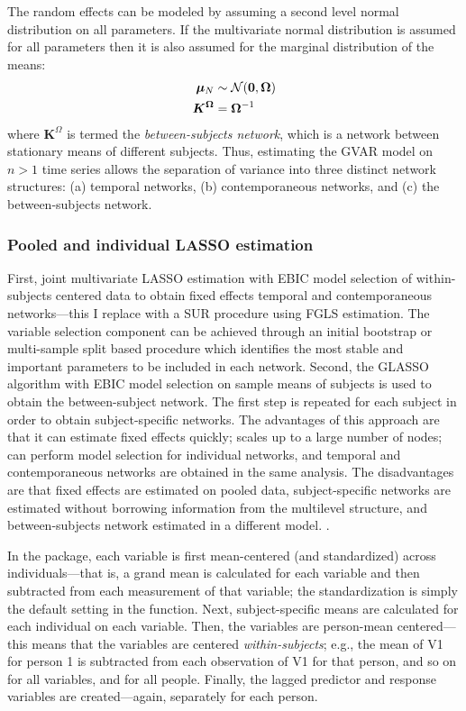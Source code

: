 The random effects can be modeled by assuming a second level normal distribution on all parameters. If the multivariate normal distribution is assumed for all parameters then it is also assumed for the marginal distribution of the means:
\begin{equation}
    \begin{split}
        \bm{\mu}_N &\sim \mathcal{N}(\mathbf{0}, \bm{\Omega}) \\
        \bm{K}^{\bm{\Omega}} &= \bm{\Omega}^{-1}
    \end{split}
\end{equation}
where $\bm{K}^{\Omega}$ is termed the \textit{between-subjects network}, which is a network between stationary means of different subjects. Thus, estimating the GVAR model on $n > 1$ time series allows the separation of variance into three distinct network structures: (a) temporal networks, (b) contemporaneous networks, and (c) the between-subjects network.

\subsubsection{Pooled and individual LASSO estimation}
First, joint multivariate LASSO estimation with EBIC model selection \cite{abegaz2013sparse} of within-subjects centered data to obtain fixed effects temporal and contemporaneous networks---this I replace with a SUR procedure using FGLS estimation. The variable selection component can be achieved through an initial bootstrap or multi-sample split based procedure which identifies the most stable and important parameters to be included in each network. Second, the GLASSO algorithm with EBIC model selection \cite{foygel2010extended} on sample means of subjects is used to obtain the between-subject network. The first step is repeated for each subject in order to obtain subject-specific networks. The advantages of this approach are that it can estimate fixed effects quickly; scales up to a large number of nodes; can perform model selection for individual networks, and temporal and contemporaneous networks are obtained in the same analysis. The disadvantages are that fixed effects are estimated on pooled data, subject-specific networks are estimated without borrowing information from the multilevel structure, and between-subjects network estimated in a different model. \cite{petersen1983ergodicity,molenaar2009new}.

In the  package, each variable is first mean-centered (and standardized) across individuals---that is, a grand mean is calculated for each variable and then subtracted from each measurement of that variable; the standardization is simply the default setting in the  function. Next, subject-specific means are calculated for each individual on each variable. Then, the variables are person-mean centered---this means that the variables are centered \textit{within-subjects}; e.g., the mean of V1 for person 1 is subtracted from each observation of V1 for that person, and so on for all variables, and for all people. Finally, the lagged predictor and response variables are created---again, separately for each person. 


